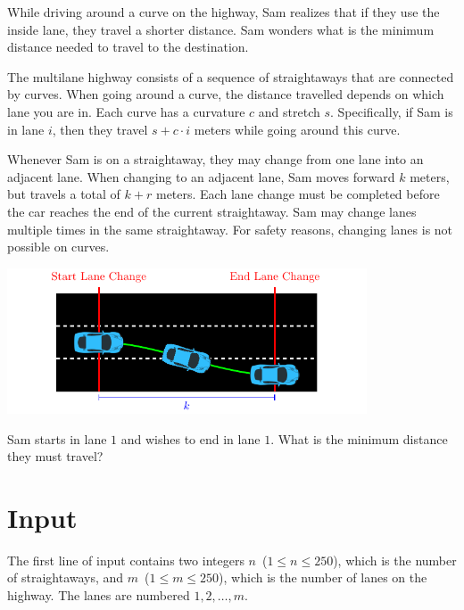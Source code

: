 
While driving around a curve on the highway, Sam realizes that if they
use the inside lane, they travel a shorter distance. Sam wonders what
is the minimum distance needed to travel to the destination.



The multilane highway consists of a sequence of straightaways that are
connected by curves. When going around a curve, the distance travelled
depends on which lane you are in. Each curve has a curvature $c$ and
stretch $s$. Specifically, if Sam is in lane $i$, then they travel
$s + c \cdot i$ meters while going around this curve.



Whenever Sam is on a straightaway, they may change from one lane into
an adjacent lane.  When changing to an adjacent lane, Sam moves
forward $k$ meters, but travels a total of $k+r$ meters.  Each lane
change must be completed before the car reaches the end of the current
straightaway.  Sam may change lanes multiple times in the same
straightaway. For safety reasons, changing lanes is not possible on
curves.

\begin{center}
 \includegraphics[width=0.8\textwidth]{chla.pdf}
\end{center}

Sam starts in lane $1$ and wishes to end in lane $1$. What is the minimum
distance they must travel?



\section*{Input}

The first line of input contains two integers
$n$~($1 \leq n \leq 250$), which is the number of straightaways, and
$m$~($1 \leq m \leq 250$), which is the number of lanes on the
highway. The lanes are numbered $1, 2, \dots, m$.




